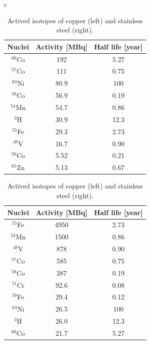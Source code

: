 \begin{table}[H]
 \centering
 \begin{tabular}{c}
  \begin{minipage}{0.4\textwidth}
  \centering
  \begin{tabular}{ccc} \hline \hline
   Nuclei & Activity [MBq] & Half life [year] \\ \hline
   $^{60}$Co & 192 & 5.27 \\
   $^{57}$Co & 111 & 0.75 \\
   $^{63}$Ni & 80.9 & 100 \\
   $^{58}$Co & 56.9 & 0.19 \\
   $^{54}$Mn & 54.7 & 0.86 \\
   $^3$H & 30.9 & 12.3 \\
   $^{55}$Fe & 29.3 & 2.73 \\
   $^{49}$V & 16.7 & 0.90 \\
   $^{56}$Co & 5.52 & 0.21 \\
   $^{65}$Zn & 5.13 & 0.67 \\ \hline \hline
  \end{tabular}
  \end{minipage}
  \hspace{0.1\textwidth}
  \begin{minipage}{0.4\textwidth}
  \centering
  \begin{tabular}{ccc} \hline \hline
   Nuclei & Activity [MBq] & Half life [year] \\ \hline
   $^{55}$Fe & 4950 & 2.73 \\
   $^{54}$Mn & 1500 & 0.86 \\
   $^{49}$V & 878 & 0.90 \\
   $^{57}$Co & 585 & 0.75 \\
   $^{58}$Co & 387 & 0.19 \\
   $^{51}$Cr & 92.6 & 0.08 \\
   $^{59}$Fe & 29.4 & 0.12 \\
   $^{63}$Ni & 26.5 & 100 \\
   $^3$H & 26.0 & 12.3 \\
   $^{60}$Co & 21.7 & 5.27 \\ \hline \hline
  \end{tabular}
  \end{minipage}
 \end{tabular}
 \caption{Actived isotopes of copper (left) and stainless steel (right).}
 \label{2atom}
\end{table}

